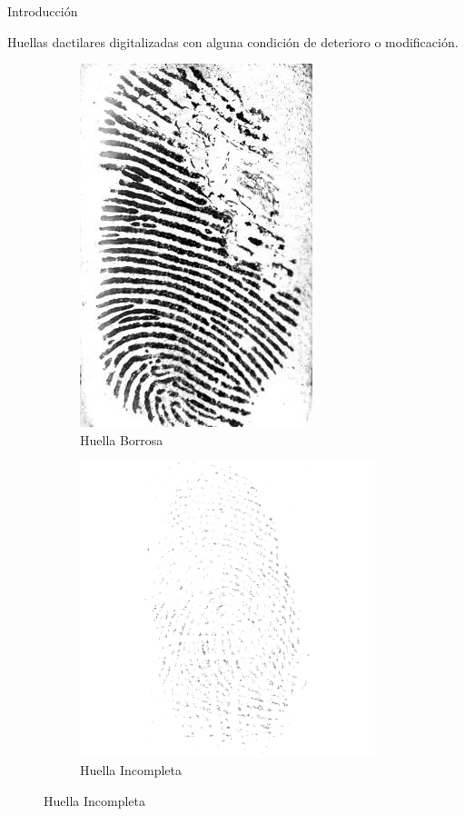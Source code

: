 \documentclass[12pt,aspectratio=169]{beamer}
\begin{document}
\begin{frame}{Introducción}

    Huellas dactilares digitalizadas con alguna condición de deterioro o modificación.
    \vspace{5mm}

    \begin{figure}[h]
        \begin{subfigure}{0.45\textwidth}
            \centering
            \includegraphics[scale=0.4]{figs/deteriorada_1.jpg}  
            \caption{Huella Borrosa}
        \end{subfigure}
        \begin{subfigure}{0.45\textwidth}
            \centering
            \includegraphics[scale=0.42]{figs/deteriorada_0.png}  
            \caption{Huella Incompleta}
        \end{subfigure}
    \end{figure}

\end{frame}
\end{document}
